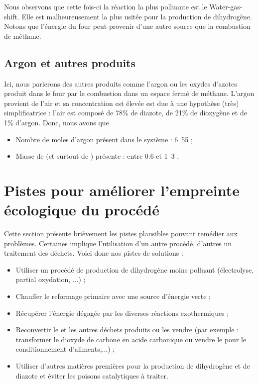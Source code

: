 Nous observons que cette fois-ci la réaction la plus polluante est le Water-gas-shift.
Elle est malheureusement la plus usitée pour la production de dihydrogène. 
Notons que l'énergie du four peut provenir d'une autre source que la combustion de méthane.

\subsection{Argon et autres produits}
Ici, nous parlerons des autres produits comme l'argon ou les oxydes d'azotes produit 
dans le four par le combustion dans un espace fermé de méthane. L'argon provient de
l'air et sa concentration est élevée est due à une hypothèse (très) simplificatrice :
l'air est composé de 78\% de diazote, de 21\% de dioxygène et de 1\% d'argon. Donc, nous 
avons que
\begin{itemize}
	\item Nombre de moles d'argon présent dans le système : \unit{6.55}{\mole\per\second} ; 
	\item Masse de  (et surtout de ) présente : entre 0.6 
	et \unit{1.3}{\ton\per\second} \cite{nitrogen_issue}.
\end{itemize}

\section{Pistes pour améliorer l'empreinte écologique du procédé}
Cette section présente brièvement les pistes plausibles pouvant remédier aux problèmes.
Certaines implique l'utilisation d'un autre procédé, d'autres un traitement des déchets.
Voici donc nos pistes de solutions :
\begin{itemize}
	\item Utiliser un procédé de production de dihydrogène moins polluant 
	(électrolyse, partial oxydation, ...) ;
	\item Chauffer le reformage primaire avec une source d'énergie verte ;
	\item Récupérer l'énergie dégagée par les diverses réactions exothermiques ;
	\item Reconvertir le  et les autres déchets produits 
	ou les vendre (par exemple : transformer le dioxyde de carbone en acide carbonique ou vendre le 
	 pour le conditionnement d'aliments,...) ;
	\item Utiliser d'autres matières premières pour la production de 
	dihydrogène et de diazote et éviter les poisons catalytiques à traiter.
\end{itemize}

